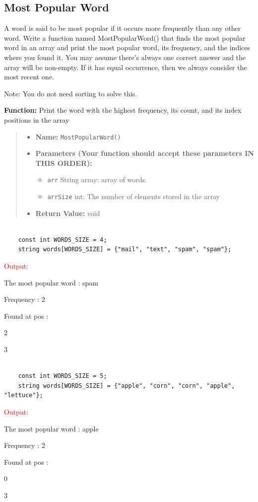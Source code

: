 \subsection{Most Popular Word}

A word is said to be most popular if it occurs more frequently than any other word. Write a function named MostPopularWord() that finds the most popular word in an array and print the most popular word, its frequency, and the indices where you found it. You may assume there's always one correct answer and the array will be non-empty. If it has equal occurrence, then we always consider the most recent one.

Note: You do not need sorting to solve this.

\textbf{Function:} Print the word with the highest frequency, its count, and its index positions in the array
\begin{quote}
\begin{itemize}
    \item \textbf{Name:} \texttt{MostPopularWord()}
    \item \textbf{Parameters (Your function should accept these parameters IN THIS ORDER):}
        \begin{itemize}
            \item \texttt{arr} String array: array of words.
            \item \texttt{arrSize} int: The number of elements stored in the array
        \end{itemize}
    \item \textbf{Return Value:} void
\end{itemize}
\end{quote}


\begin{sample}

    \begin{verbatim}
    
    const int WORDS_SIZE = 4;
    string words[WORDS_SIZE] = {"mail", "text", "spam", "spam"};
\end{verbatim}
\textcolor{red}{Output:}

The most popular word : spam

Frequency : 2

Found at pos :

2

3
\end{sample}

\begin{sample}

    \begin{verbatim}
    
    const int WORDS_SIZE = 5;
    string words[WORDS_SIZE] = {"apple", "corn", "corn", "apple", "lettuce"};
\end{verbatim}
\textcolor{red}{Output:}

The most popular word : apple

Frequency : 2

Found at pos :

0

3
\end{sample}



